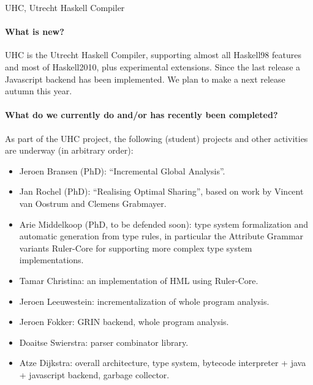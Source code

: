\begin{hcarentry}{UHC, Utrecht Haskell Compiler}
\label{uhc}
\label{ehc}
\makeheader

\paragraph{What is new?}
UHC is the Utrecht Haskell Compiler, supporting almost all Haskell98 features and most of Haskell2010, plus
experimental extensions.
Since the last release a Javascript backend has been implemented.
We plan to make a next release autumn this year.

\paragraph{What do we currently do and/or has recently been completed?}
As part of the UHC project, the following (student) projects and other activities are underway (in arbitrary order):
\begin{itemize}
\item Jeroen Bransen (PhD): ``Incremental Global Analysis''.
\item Jan Rochel (PhD): ``Realising Optimal Sharing'', based on work by Vincent van Oostrum and Clemens Grabmayer.
\item Arie Middelkoop (PhD, to be defended soon): type system formalization and automatic generation from type rules, in particular the Attribute Grammar variants Ruler-Core for supporting more complex type system implementations.
\item Tamar Christina: an implementation of HML using Ruler-Core.
\item Jeroen Leeuwestein: incrementalization of whole program analysis.
\item Jeroen Fokker: GRIN backend, whole program analysis.
\item Doaitse Swierstra: parser combinator library.
\item Atze Dijkstra: overall architecture, type system, bytecode interpreter + java + javascript backend, garbage collector.
\end{itemize}


\end{hcarentry}
